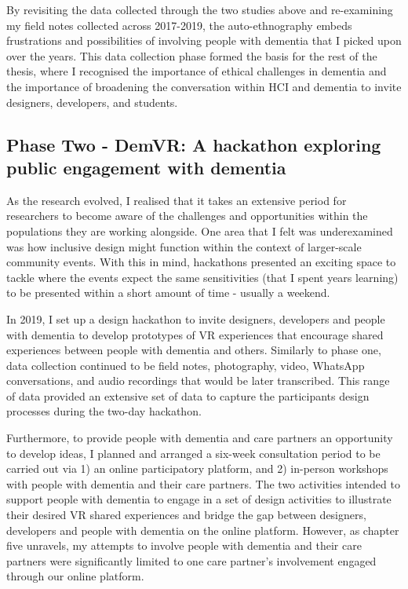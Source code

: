 By revisiting the data collected through the two studies above and re-examining my field notes collected across 2017-2019, the auto-ethnography embeds frustrations and possibilities of involving people with dementia that I picked upon over the years. This data collection phase formed the basis for the rest of the thesis, where I recognised the importance of ethical challenges in dementia and the importance of broadening the conversation within HCI and dementia to invite designers, developers, and students. 

\subsection{Phase Two - DemVR: A hackathon exploring public engagement with dementia}

As the research evolved, I realised that it takes an extensive period for researchers to become aware of the challenges and opportunities within the populations they are working alongside. One area that I felt was underexamined was how inclusive design might function within the context of larger-scale community events. With this in mind, hackathons presented an exciting space to tackle where the events expect the same sensitivities (that I spent years learning) to be presented within a short amount of time - usually a weekend. 

In 2019, I set up a design hackathon to invite designers, developers and people with dementia to develop prototypes of VR experiences that encourage shared experiences between people with dementia and others. Similarly to phase one, data collection continued to be field notes, photography, video, WhatsApp conversations, and audio recordings that would be later transcribed. This range of data provided an extensive set of data to capture the participants design processes during the two-day hackathon. 

Furthermore, to provide people with dementia and care partners an opportunity to develop ideas, I planned and arranged a six-week consultation period to be carried out via 1) an online participatory platform, and 2) in-person workshops with people with dementia and their care partners. The two activities intended to support people with dementia to engage in a set of design activities to illustrate their desired VR shared experiences and bridge the gap between designers, developers and people with dementia on the online platform. However, as chapter five unravels, my attempts to involve people with dementia and their care partners were significantly limited to one care partner’s involvement engaged through our online platform. 

